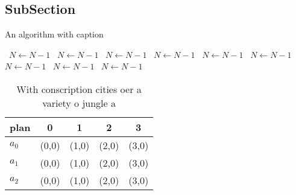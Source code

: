 \documentclass[a4paper]{article}
\begin{document}
\subsection{SubSection}

\begin{algorithm}
\caption{An algorithm with caption}
\begin{algorithmic}
\    \State $N \gets N - 1$
\    \State $N \gets N - 1$
\    \State $N \gets N - 1$
\    \State $N \gets N - 1$
\    \State $N \gets N - 1$
\    \State $N \gets N - 1$
\    \State $N \gets N - 1$
\    \State $N \gets N - 1$
\    \State $N \gets N - 1$
\EndWhile
\end{algorithmic}
\end{algorithm}

\begin{table}
\begin{adjustbox}{width=0.5\columnwidth}
\begin{tabular}{|l|l|l|l|l|}
\hline
\textbf{plan} & \multicolumn{1}{c|}{\textbf{0}} & \multicolumn{1}{c|}{\textbf{1}} & \multicolumn{1}{c|}{\textbf{2}} & \multicolumn{1}{c|}{\textbf{3}} \\ \hline
\textbf{$a_0$}  & (0,0) & (1,0) & (2,0) & (3,0) \\ \hline
\textbf{$a_1$}  & (0,0) & (1,0) & (2,0) & (3,0) \\ \hline
\textbf{$a_2$}  & (0,0) & (1,0) & (2,0) & (3,0) \\ \hline
\end{tabular}
\end{adjustbox}
\caption{With conscription cities oer a variety o jungle a
}
\end{table}
\end{document}
